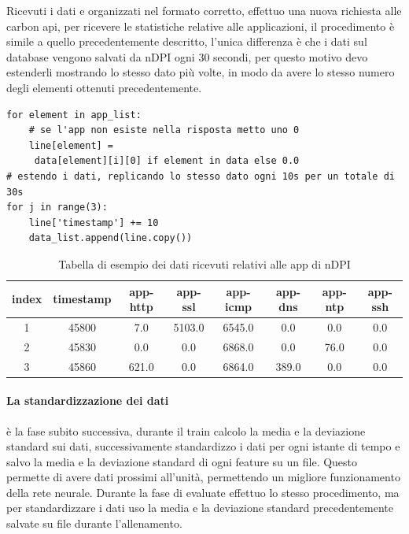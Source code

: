 Ricevuti i dati e organizzati nel formato corretto, effettuo una nuova richiesta alle carbon api, per ricevere le statistiche relative alle applicazioni, il procedimento è simile a quello precedentemente descritto, l'unica differenza è che i dati sul database vengono salvati da nDPI ogni 30 secondi, per questo motivo devo estenderli mostrando lo stesso dato più volte, in modo da avere lo stesso numero degli elementi ottenuti precedentemente.

\begin{lstlisting}[language=python3]
for element in app_list:
    # se l'app non esiste nella risposta metto uno 0
    line[element] =
     data[element][i][0] if element in data else 0.0
# estendo i dati, replicando lo stesso dato ogni 10s per un totale di 30s
for j in range(3):
    line['timestamp'] += 10
    data_list.append(line.copy())
\end{lstlisting}

\begin{table}[]
    \begin{tabular}{||c c c c c c c c||} 
    \hline
    index & timestamp  & app-http & app-ssl & app-icmp & app-dns & app-ntp & app-ssh \\ [0.5ex] 
    \hline\hline
    1 & 45800 & 7.0 & 5103.0 & 6545.0 & 0.0 &  0.0 &  0.0\\ 
    \hline
    2 & 45830 & 0.0 & 0.0 & 6868.0& 0.0 &  76.0 & 0.0\\
    \hline
    3 & 45860 & 621.0 & 0.0 & 6864.0 & 389.0  &  0.0 &  0.0\\
    \hline
    \end{tabular}
    \caption{Tabella di esempio dei dati ricevuti relativi alle app di nDPI}
    \label{table:tabella_dati_2}
\end{table}


\paragraph{La standardizzazione dei dati} è la fase subito successiva,
durante il train calcolo la media e la deviazione standard sui dati, successivamente standardizzo  i dati per ogni istante di tempo e salvo la media e la deviazione standard di ogni feature su un file. Questo permette di avere dati prossimi all'unità, permettendo un migliore funzionamento della rete neurale. Durante la fase di evaluate effettuo lo stesso procedimento, ma per standardizzare i dati uso la media e la deviazione standard precedentemente salvate su file durante l'allenamento.

